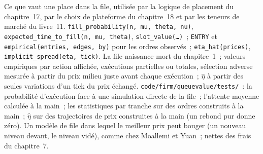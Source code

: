 \begin{build}
 Ce que vaut une place dans la file, utilisée par la logique de placement du chapitre~17, par le choix de plateforme du chapitre~18 et par les teneurs de marché
du livre~11.
 \texttt{fill\_probability(n, mu, theta, nu)}, \texttt{expected\_time\_to\_fill(n, mu, theta)}, \texttt{slot\_value(\dots)}~;
\texttt{ENTRY} et \texttt{empirical(entries, edges, by)} pour les ordres observés~; \texttt{eta\_hat(prices)}, \texttt{implicit\_spread(eta, tick)}.
 La file naissance-mort du chapitre~1~; valeurs empiriques par action affichée, exécutions partielles ou totales, sélection adverse mesurée à partir du prix milieu
juste avant chaque exécution~; $\hat\eta$ à partir des seules variations d'un tick du prix échangé.
 \texttt{code/firm/queuevalue/tests/}~: la probabilité d'exécution face à une simulation directe de la file~; l'attente moyenne calculée à la main~;
les statistiques par tranche sur des ordres construits à la main~; $\hat\eta$ sur des trajectoires de prix construites à la main (un rebond pur donne zéro).
 Un modèle de file dans lequel le meilleur prix peut bouger (un nouveau niveau devant, le niveau vidé), comme chez Moallemi et Yuan~;  nettes
des frais du chapitre~7.
\end{build}

